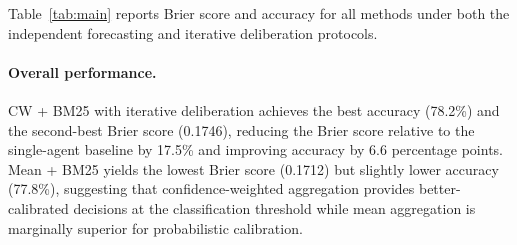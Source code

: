 \documentclass[11pt]{article}
\theoremstyle{definition}          %
\begin{document}
Table~\ref{tab:main} reports Brier score and accuracy for all methods under both
the independent forecasting and iterative deliberation protocols.

\begin{table}[t]
\centering
\caption{Results on the Polymarket binary forecasting benchmark ($N=497$).
  \textbf{Bold} denotes the best result per column; \underline{underline} the second best.
  ``Indep.'' refers to independent forecasting ($R=1$); ``Iter.'' to iterative deliberation ($R=2$).}
\label{tab:main}

\end{table}
\paragraph{Overall performance.}
CW + BM25 with iterative deliberation achieves the best accuracy (78.2\%) and the
second-best Brier score (0.1746), reducing the Brier score relative to the single-agent
baseline by 17.5\% and improving accuracy by 6.6 percentage points.
Mean + BM25 yields the lowest Brier score (0.1712) but slightly lower accuracy (77.8\%),
suggesting that confidence-weighted aggregation provides better-calibrated decisions at
the classification threshold while mean aggregation is marginally superior for probabilistic
calibration.
\end{document}
